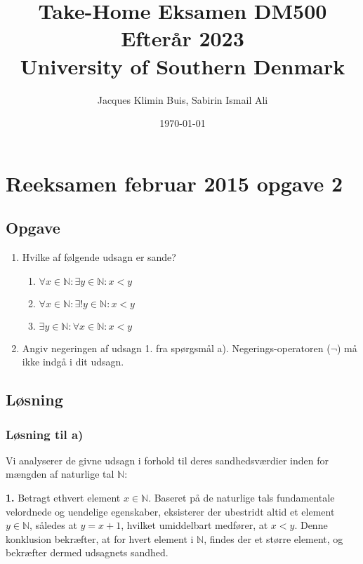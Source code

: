 \documentclass[12pt]{article}
\title{ 
    \vspace{2in} %
    \textbf{Take-Home Eksamen DM500 Efterår 2023}\\ %
    \vspace{0.5in} %
    \large University of Southern Denmark\\ %
    \vspace{1.5in} %
}
\author{Jacques Klimin Buis, Sabirin Ismail Ali}
\date{\today}
\begin{document}
\maketitle
\thispagestyle{empty} %
\newpage

\tableofcontents
\thispagestyle{empty}
\newpage

\setcounter{page}{1}

\section{Reeksamen februar 2015 opgave 2}

\subsection{Opgave}
\begin{enumerate}[label=\alph*)] %
    \item Hvilke af følgende udsagn er sande?
    \begin{enumerate}[label=\arabic*.] %
        \item \(\forall x \in \mathbb{N}: \exists y \in \mathbb{N}: x < y\)
        \item \(\forall x \in \mathbb{N}: \exists! y \in \mathbb{N}: x < y\)
        \item \(\exists y \in \mathbb{N}: \forall x \in \mathbb{N}: x < y\)
    \end{enumerate}
    \item Angiv negeringen af udsagn 1. fra spørgsmål a). Negerings-operatoren (\(\neg\)) må ikke indgå i dit udsagn.
\end{enumerate}

\subsection{Løsning}
\subsubsection{Løsning til a)}
Vi analyserer de givne udsagn i forhold til deres sandhedsværdier inden for mængden af naturlige tal \(\mathbb{N}\):

\vspace{0.25in}

\textbf{1.} Betragt ethvert element \(x \in \mathbb{N}\). Baseret på de naturlige tals fundamentale velordnede og uendelige egenskaber, eksisterer der ubestridt altid et element \(y \in \mathbb{N}\), således at \(y = x + 1\), hvilket umiddelbart medfører, at \(x < y\). Denne konklusion bekræfter, at for hvert element i \(\mathbb{N}\), findes der et større element, og bekræfter dermed udsagnets sandhed. 
\end{document}
